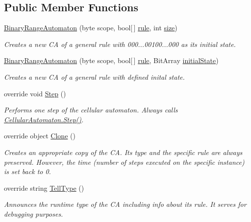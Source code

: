 \subsection*{Public Member Functions}
\begin{DoxyCompactItemize}
\item 
\hyperlink{class_cellular_1_1_binary_range_automaton_a3b165a9e98e516bf7e9bdb8bb2fe16a7}{Binary\+Range\+Automaton} (byte scope, bool\mbox{[}$\,$\mbox{]} \hyperlink{class_cellular_1_1_binary_range_automaton_a4dda99c3151599c8ef12d08d7472144c}{rule}, int \hyperlink{class_cellular_1_1_automaton1_d_a915129ccf0f1e7092844c99ce6a28e5b}{size})
\begin{DoxyCompactList}\small\item\em Creates a new C\+A of a general rule with 000...00100...000 as its initial state. \end{DoxyCompactList}\item 
\hyperlink{class_cellular_1_1_binary_range_automaton_a704950c30ff58c587c8a717f9f2c839b}{Binary\+Range\+Automaton} (byte scope, bool\mbox{[}$\,$\mbox{]} \hyperlink{class_cellular_1_1_binary_range_automaton_a4dda99c3151599c8ef12d08d7472144c}{rule}, Bit\+Array \hyperlink{all__1_8js_ae8b87ff4be2ae1dd5267342795263360}{initial\+State})
\begin{DoxyCompactList}\small\item\em Creates a new C\+A of a general rule with defined inital state. \end{DoxyCompactList}\item 
override void \hyperlink{class_cellular_1_1_binary_range_automaton_ade1f5b831b9676f04f835c33d245b9e2}{Step} ()
\begin{DoxyCompactList}\small\item\em Performs one step of the cellular automaton. Always calls {\ttfamily \hyperlink{class_cellular_1_1_cellular_automaton_aa70848d58015575974bc875ac5a89ae7}{Cellular\+Automaton.\+Step()}}. \end{DoxyCompactList}\item 
override object \hyperlink{class_cellular_1_1_binary_range_automaton_a12f010562e04785e0a7efb113302687e}{Clone} ()
\begin{DoxyCompactList}\small\item\em Creates an appropriate copy of the C\+A. Its type and the specific rule are always preserved. However, the time (number of steps executed on the specific instance) is set back to 0. \end{DoxyCompactList}\item 
override string \hyperlink{class_cellular_1_1_binary_range_automaton_afad205eb4fea51efd63b063f96bfda5c}{Tell\+Type} ()
\begin{DoxyCompactList}\small\item\em Announces the runtime type of the C\+A including info about its rule. It serves for debugging purposes. \end{DoxyCompactList}\end{DoxyCompactItemize}
